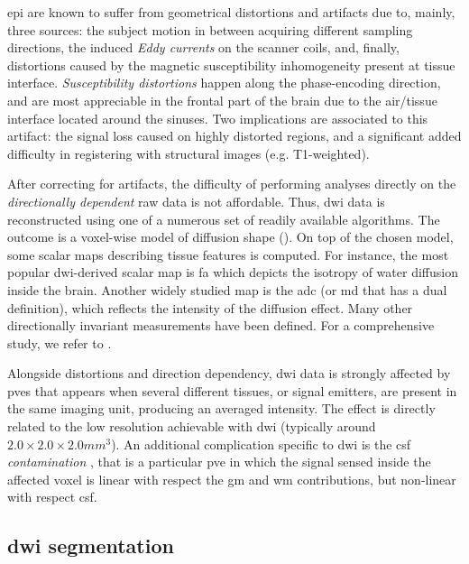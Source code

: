 \Gls{epi} are known to suffer from geometrical distortions and artifacts
due to, mainly, three sources: the subject motion in between acquiring 
different sampling directions, the induced \emph{Eddy currents} on the scanner 
coils, and, finally, distortions caused by the magnetic susceptibility inhomogeneity
present at tissue interface. \emph{Susceptibility distortions} happen along the 
phase-encoding direction, and are most appreciable in the frontal part of 
the brain due to the air/tissue interface located around the sinuses.
Two implications are associated to this artifact: the signal loss caused on
highly distorted regions, and a significant added difficulty in 
registering with structural images (e.g. T1-weighted).

After correcting for artifacts, the difficulty of performing analyses directly
on the \emph{directionally dependent} raw data is not affordable. Thus, 
\gls{dwi} data is reconstructed using one of a numerous set of readily 
available algorithms. The outcome is a voxel-wise model of diffusion shape 
(). On top of the
chosen model, some scalar maps describing tissue features is
computed. For instance, the most popular \gls{dwi}-derived scalar map 
is \gls{fa} which depicts the isotropy of water diffusion inside the brain.
Another widely studied map is the \gls{adc} (or \gls{md} that has a dual definition),
which reflects the intensity of the diffusion effect. Many other
directionally invariant measurements have been defined. For a comprehensive study, 
we refer to \citep{ennis_orthogonal_2006}.

Alongside distortions and direction dependency, \gls{dwi} data is strongly 
affected by \glspl{pve} \citep{alexander_analysis_2001} that appears when
several different tissues, or signal 
emitters, are present in the same imaging unit, producing an averaged intensity. 
The effect is directly related to the low resolution achievable with \gls{dwi} 
(typically around $2.0\times2.0\times2.0mm^3$). An additional complication specific to
\gls{dwi} is the \gls{csf} \emph{contamination} \citep{metzler-baddeley_how_2012},
that is a particular \gls{pve} in which the signal sensed inside the affected voxel is 
linear with respect the \gls{gm} and \gls{wm} contributions, but non-linear with
respect \gls{csf}.


\subsection{\Gls{dwi} segmentation}
\label{sec:dwi_segmentation}

